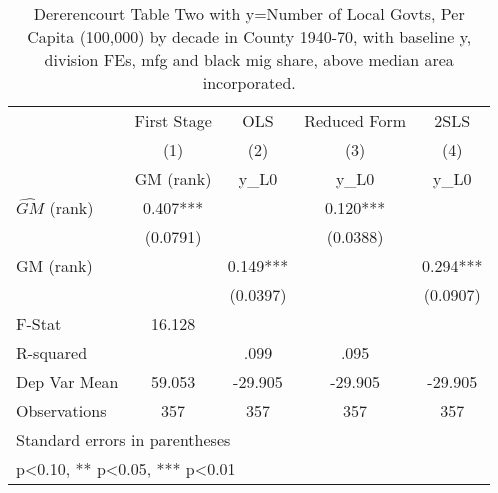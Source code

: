 \begin{table}[htbp]\centering
\def\sym#1{\ifmmode^{#1}\else\(^{#1}\)\fi}
\caption{Dererencourt Table Two with y=Number of Local Govts, Per Capita (100,000) by decade in County 1940-70, with baseline y, division FEs, mfg and black mig share, above median area incorporated.}
\begin{tabular}{l*{4}{c}}
\toprule
                    & First Stage   &         OLS   &Reduced Form   &        2SLS   \\
                    &\multicolumn{1}{c}{(1)}&\multicolumn{1}{c}{(2)}&\multicolumn{1}{c}{(3)}&\multicolumn{1}{c}{(4)}\\
                    &\multicolumn{1}{c}{GM  (rank)}&\multicolumn{1}{c}{y\_L0}&\multicolumn{1}{c}{y\_L0}&\multicolumn{1}{c}{y\_L0}\\
\midrule
$\hat{GM}$ (rank)   &       0.407***&               &       0.120***&               \\
                    &    (0.0791)   &               &    (0.0388)   &               \\
\addlinespace
GM  (rank)          &               &       0.149***&               &       0.294***\\
                    &               &    (0.0397)   &               &    (0.0907)   \\
\midrule
F-Stat              &      16.128   &               &               &               \\
R-squared           &               &        .099   &        .095   &               \\
Dep Var Mean        &      59.053   &     -29.905   &     -29.905   &     -29.905   \\
Observations        &         357   &         357   &         357   &         357   \\
\bottomrule
\multicolumn{5}{l}{\footnotesize Standard errors in parentheses}\\
\multicolumn{5}{l}{\footnotesize * p<0.10, ** p<0.05, *** p<0.01}\\
\end{tabular}
\end{table}
